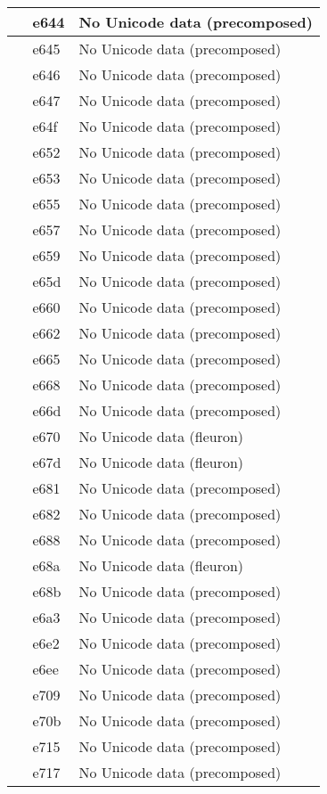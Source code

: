 \documentclass[12pt,letterpaper,openany]{book}
\begin{document}
\begin{center}
\begin{supertabular}{|m{0.25in}|m{0.5in}|m{4in}|}
 & e644 & No Unicode data (precomposed)\\\hline
 & e645 & No Unicode data (precomposed)\\\hline
 & e646 & No Unicode data (precomposed)\\\hline
 & e647 & No Unicode data (precomposed)\\\hline
 & e64f & No Unicode data (precomposed)\\\hline
 & e652 & No Unicode data (precomposed)\\\hline
 & e653 & No Unicode data (precomposed)\\\hline
 & e655 & No Unicode data (precomposed)\\\hline
 & e657 & No Unicode data (precomposed)\\\hline
 & e659 & No Unicode data (precomposed)\\\hline
 & e65d & No Unicode data (precomposed)\\\hline
 & e660 & No Unicode data (precomposed)\\\hline
 & e662 & No Unicode data (precomposed)\\\hline
 & e665 & No Unicode data (precomposed)\\\hline
 & e668 & No Unicode data (precomposed)\\\hline
 & e66d & No Unicode data (precomposed)\\\hline
 & e670 & No Unicode data (fleuron)\\\hline
 & e67d & No Unicode data (fleuron)\\\hline
 & e681 & No Unicode data (precomposed)\\\hline
 & e682 & No Unicode data (precomposed)\\\hline
 & e688 & No Unicode data (precomposed)\\\hline
 & e68a & No Unicode data (fleuron)\\\hline
 & e68b & No Unicode data (precomposed)\\\hline
 & e6a3 & No Unicode data (precomposed)\\\hline
 & e6e2 & No Unicode data (precomposed)\\\hline
 & e6ee & No Unicode data (precomposed)\\\hline
 & e709 & No Unicode data (precomposed)\\\hline
 & e70b & No Unicode data (precomposed)\\\hline
 & e715 & No Unicode data (precomposed)\\\hline
 & e717 & No Unicode data (precomposed)\\\hline

\end{supertabular}
\end{center}
\end{document}
